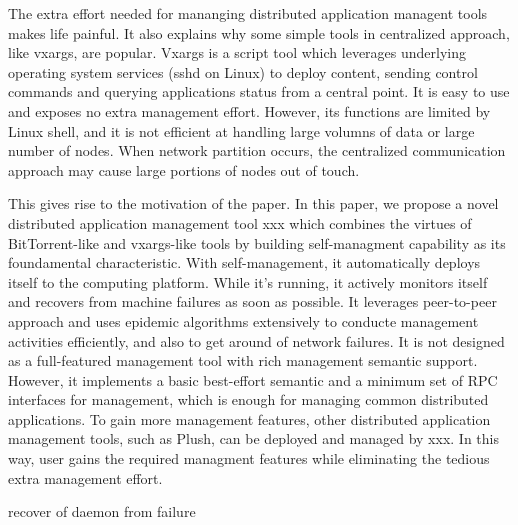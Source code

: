 \documentclass[10pt, twocolumn]{article}
\begin{document}
\iffalse
The situation is similar for the
centralized management tools. The central controller and every
clients have to be deployed and managed.  Some centralized tools
make use of services provided by operating systems as
clients---e.g. sshd of *nix systems---and avoid the deployment
and management of these services but the management functions
are limited.  It is a choice to use management services that are
already deployed and maintained by others, which kicks the ball
back to the operators of the services. 
\fi

The extra effort needed for mananging distributed application
managent tools makes life painful. It also explains why some
simple tools in centralized approach, like vxargs, are popular.
Vxargs is a script tool which leverages underlying operating
system services (sshd on Linux) to deploy content, sending
control commands and querying applications status from a central
point. It is easy to use and exposes no extra management effort.
However, its functions are limited by Linux shell, and it is not
efficient at handling large volumns of data or large number of
nodes. When network partition occurs, the centralized
communication approach may cause large portions of nodes out of
touch.

This gives rise to the motivation of the paper. In this paper,
we propose a novel distributed application management tool xxx which
combines the virtues of BitTorrent-like and vxargs-like tools by
building self-managment capability as its foundamental
characteristic.  With self-management, it automatically deploys
itself to the computing platform. While it's running, it
actively monitors itself and recovers from machine failures as
soon as possible.  It leverages peer-to-peer approach and uses
epidemic algorithms extensively to conducte management
activities efficiently, and also to get around of network
failures. It is not designed as a full-featured management tool
with rich management semantic support. However, it implements a
basic best-effort semantic and a minimum set of RPC interfaces
for management, which is enough for managing common distributed
applications. To gain more management features, other
distributed application management tools, such as Plush, can be
deployed and managed by xxx. In this way, user gains the
required managment features while eliminating the tedious extra
management effort.

\iffalse
The challenges:

1. moderate authentication and encryption mechanism is need to
protecting user credentials. It is used at `login' step of
self deployment. The mechanism is also needed to prevent
un-authorized users to use xxx.

2. 
\fi


recover of daemon from failure


 
\end{document}
